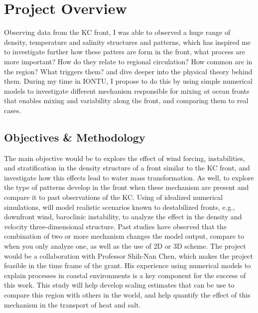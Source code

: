 \documentclass[letterpaper, 12pt ]{article}
\begin{document}
\begin{enumerate}
    
\end{enumerate}

\section*{Project Overview}

Observing data from the KC front, I was able to observed a huge range of density, temperature and salinity structures and patterns, which has inspired me to investigate further how these patters are form in the front, what process are more important? How do they relate to regional circulation? How common are in the region? What triggers them? and dive deeper into the physical theory behind them. During my time in IONTU, I propose to do this by using simple numerical models to investigate different mechanism responsible for mixing at ocean fronts that enables mixing and variability along the front, and comparing them to real cases. 

 \subsection*{Objectives \& Methodology}
The main objective would be to explore the effect of wind forcing, instabilities, and stratification in the density structure of a front similar to the KC front, and investigate how this effects lead to water mass transformation. As well, to explore the type of patterns develop in the front when these mechanism are present and compare it to past observations of the KC. Using of idealized numerical simulations, will model realistic scenarios known to destabilized fronts,  e.g., downfront wind, baroclinic instability, to analyze the effect in the density and velocity three-dimensional structure. Past studies have observed that the combination of two or more mechanism changes the model output, compare to when you only analyze one, as well as the use of 2D or 3D scheme. The project would be a collaboration with Professor Shih-Nan Chen, which makes the project feasible in the time frame of the grant. His experience using numerical models to explain processes in coastal environments is a key component for the success of this work. This study will help develop scaling estimates that can be use to compare this region with others in the world, and help quantify the effect of this mechanism in the transport of heat and salt. 
\end{document}
